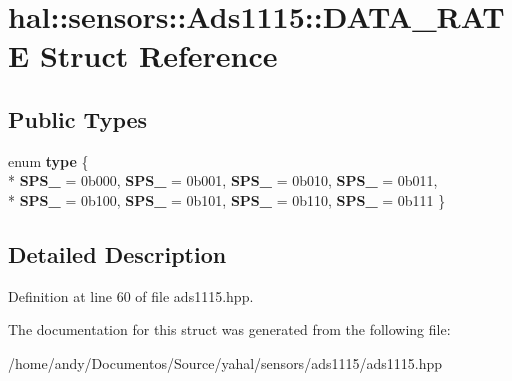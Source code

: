 \hypertarget{structhal_1_1sensors_1_1_ads1115_1_1_d_a_t_a___r_a_t_e}{}\section{hal\+:\+:sensors\+:\+:Ads1115\+:\+:D\+A\+T\+A\+\_\+\+R\+A\+T\+E Struct Reference}
\label{structhal_1_1sensors_1_1_ads1115_1_1_d_a_t_a___r_a_t_e}
\subsection*{Public Types}
\begin{DoxyCompactItemize}
\item 
\hypertarget{structhal_1_1sensors_1_1_ads1115_1_1_d_a_t_a___r_a_t_e_a85e533bbdebc2ef3ab4a55e83c4b3128}{}enum {\bfseries type} \{ \\*
{\bfseries S\+P\+S\+\_} = 0b000, 
{\bfseries S\+P\+S\+\_} = 0b001, 
{\bfseries S\+P\+S\+\_} = 0b010, 
{\bfseries S\+P\+S\+\_} = 0b011, 
\\*
{\bfseries S\+P\+S\+\_} = 0b100, 
{\bfseries S\+P\+S\+\_} = 0b101, 
{\bfseries S\+P\+S\+\_} = 0b110, 
{\bfseries S\+P\+S\+\_} = 0b111
 \}\label{structhal_1_1sensors_1_1_ads1115_1_1_d_a_t_a___r_a_t_e_a85e533bbdebc2ef3ab4a55e83c4b3128}

\end{DoxyCompactItemize}


\subsection{Detailed Description}


Definition at line 60 of file ads1115.\+hpp.



The documentation for this struct was generated from the following file\+:\begin{DoxyCompactItemize}
\item 
/home/andy/\+Documentos/\+Source/yahal/sensors/ads1115/ads1115.\+hpp\end{DoxyCompactItemize}
